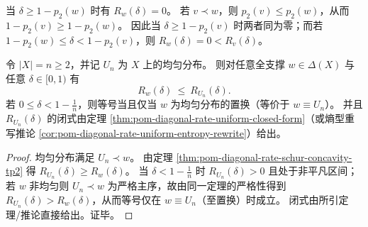 \begin{remark}[零速率区间的等号情形]\label{rem:pom-diagonal-rate-zero-rate-majorization}
当 \(\delta\ge 1-p_2(w)\) 时有 \(R_w(\delta)=0\)。
若 \(v\prec w\)，则 \(p_2(v)\le p_2(w)\)，从而 \(1-p_2(v)\ge 1-p_2(w)\)。
因此当 \(\delta\ge 1-p_2(v)\) 时两者同为零；而若 \(1-p_2(w)\le\delta<1-p_2(v)\)，则 \(R_w(\delta)=0<R_v(\delta)\)。
\end{remark}

\begin{corollary}[均匀极大与闭式上界]\label{cor:pom-diagonal-rate-uniform-global-max}
令 \(|X|=n\ge 2\)，并记 \(U_n\) 为 \(X\) 上的均匀分布。
则对任意全支撑 \(w\in\Delta(X)\) 与任意 \(\delta\in[0,1)\) 有
\[
R_w(\delta)\ \le\ R_{U_n}(\delta).
\]
若 \(0\le\delta<1-\tfrac1n\)，则等号当且仅当 \(w\) 为均匀分布的置换（等价于 \(w\equiv U_n\)）。
并且 \(R_{U_n}(\delta)\) 的闭式由定理 \ref{thm:pom-diagonal-rate-uniform-closed-form}（或熵型重写推论 \ref{cor:pom-diagonal-rate-uniform-entropy-rewrite}）给出。
\end{corollary}
\begin{proof}
均匀分布满足 \(U_n\prec w\)。
由定理 \ref{thm:pom-diagonal-rate-schur-concavity-tp2} 得 \(R_{U_n}(\delta)\ge R_w(\delta)\)。
当 \(\delta<1-\tfrac1n\) 时 \(R_{U_n}(\delta)>0\) 且处于非平凡区间；
若 \(w\) 非均匀则 \(U_n\prec w\) 为严格主序，故由同一定理的严格性得到 \(R_{U_n}(\delta)>R_w(\delta)\)，从而等号仅在 \(w\equiv U_n\)（至置换）时成立。
闭式由所引定理/推论直接给出。证毕。
\end{proof}

